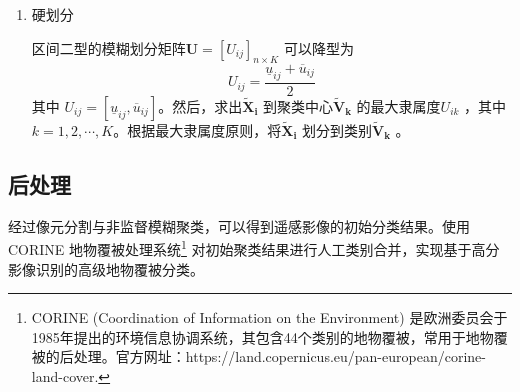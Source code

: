 \begin{enumerate}[(1)]
    \item 硬划分

          区间二型的模糊划分矩阵$\bm{U} = [U_{ij}]_{n \times K}$ 可以降型为
          \begin{equation}\label{eq:21}
              U_{ij} = \frac{\underline{u}_{ij} + \overline{u}_{ij}}{2}
          \end{equation}
          其中 $U_{ij} = [\underline{u}_{ij}, \overline{u}_{ij}]$。然后，求出$\bm{\tilde{X}_i}$ 到聚类中心$\bm{\tilde{V}_k}$ 的最大隶属度$U_{ik}$ ，其中$k = 1, 2,\cdots, K$。根据最大隶属度原则，将$\bm{\tilde{X}_i}$ 划分到类别$\bm{\tilde{V}_k}$ 。



\end{enumerate}


\subsection{后处理}
\label{subsec::chap03-3-3}

经过像元分割与非监督模糊聚类，可以得到遥感影像的初始分类结果。使用CORINE 地物覆被处理系统\footnote{CORINE (Coordination of Information on the Environment) 是欧洲委员会于1985年提出的环境信息协调系统，其包含44个类别的地物覆被，常用于地物覆被的后处理。官方网址：https://land.copernicus.eu/pan-european/corine-land-cover.} 对初始聚类结果进行人工类别合并，实现基于高分影像识别的高级地物覆被分类\cite{zhang2011progress}。

